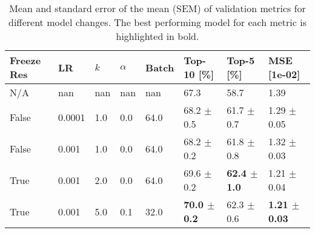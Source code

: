 \begin{table}[h]
\caption{Mean and standard error of the mean (SEM) of validation metrics for different model changes. The best performing model for each metric is highlighted in bold.}
\label{tab:model_changes}
\begin{tabular}{llllllll}
\toprule
Freeze Res & LR & $k$ & $\alpha$ & Batch & Top-10 [\%] & Top-5 [\%] & MSE [1e-02] \\
\midrule
N/A & nan & nan & nan & nan & 67.3 & 58.7 & 1.39 \\
False & 0.0001 & 1.0 & 0.0 & 64.0 & 68.2 $\pm$ 0.5 & 61.7 $\pm$ 0.7 & 1.29 $\pm$ 0.05 \\
False & 0.001 & 1.0 & 0.0 & 64.0 & 68.2 $\pm$ 0.2 & 61.8 $\pm$ 0.8 & 1.32 $\pm$ 0.03 \\
True & 0.001 & 2.0 & 0.0 & 64.0 & 69.6 $\pm$ 0.2 & \textbf{62.4 $\pm$ 1.0} & 1.21 $\pm$ 0.04 \\
True & 0.001 & 5.0 & 0.1 & 32.0 & \textbf{70.0 $\pm$ 0.2} & 62.3 $\pm$ 0.6 & \textbf{1.21 $\pm$ 0.03} \\
\bottomrule
\end{tabular}
\end{table}
